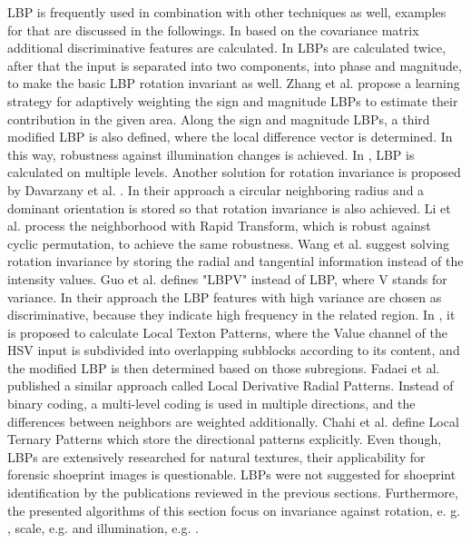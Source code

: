 \documentclass[draft,final]{vutinfth} %
\begin{document}
LBP is frequently used in combination with other techniques as well, examples for that are discussed in the followings. 
In \cite{hong2014combining} based on the covariance matrix additional discriminative features are calculated. 
In \cite{guo2010completed} LBPs are calculated twice, after that the input is separated into two components, into phase and magnitude, to make the basic LBP rotation invariant as well.
Zhang et al.  \cite{zhang2017learning} propose a learning strategy for adaptively weighting the sign and magnitude LBPs to estimate their contribution in the given area. 
Along the sign and magnitude LBPs, a third modified LBP is also defined, where the local difference vector is determined.
In this way, robustness against illumination changes is achieved.
In \cite{khellah2011texture}, LBP is calculated on multiple levels.
Another solution for rotation invariance is proposed by Davarzany et al. \cite{davarzani2015scale}. 
In their approach a circular neighboring radius and a dominant orientation is stored so that rotation invariance is also achieved.
Li et al. \cite{li2014rapid} process the neighborhood with Rapid Transform, which is robust against cyclic permutation, to achieve the same robustness.
Wang et al. \cite{wang2017local} suggest solving rotation invariance by storing the radial and tangential information instead of the intensity values.
Guo et al. \cite{guo2010rotation} defines "LBPV" instead of LBP, where V stands for variance. 
In their approach the LBP features with high variance are chosen as discriminative, because they indicate high frequency in the related region.
In \cite{bala2016local}, it is proposed to calculate Local Texton Patterns, where the Value channel of the HSV input is subdivided into overlapping subblocks according to its content, and the modified LBP is then determined based on those subregions.
Fadaei et al. \cite{fadaei2017local} published a similar approach called Local Derivative Radial Patterns.
Instead of binary coding, a multi-level coding is used in multiple directions, and the differences between neighbors are weighted additionally. 
Chahi et al. \cite{chahi2018local} define Local Ternary Patterns which store the directional patterns explicitly.
Even though, LBPs are extensively researched for natural textures, their applicability for forensic shoeprint images is questionable.
LBPs were not suggested for shoeprint identification by the publications reviewed in the previous sections.
Furthermore, the presented algorithms of this section focus on invariance against rotation, e. g. \cite{khellah2011texture}, scale, e.g. \cite{davarzani2015scale}  and illumination, e.g. \cite{zhang2017learning}.
\end{document}
